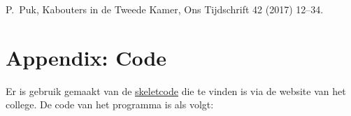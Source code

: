 \documentclass[10pt]{article}
\begin{document}
\begin{thebibliography}{XX}

P.~Puk, Kabouters in de Tweede Kamer,
Ons Tijdschrift 42 (2017) 12--34.

\end{thebibliography}

\section*{Appendix: Code}

Er is gebruik gemaakt van de \href{http://www.liacs.leidenuniv.nl/~kosterswa/AI/iets.cc}{\underline{skeletcode}} die te vinden is via
de website van het college.
De code van het programma is als volgt:

\smallskip
\end{document}
